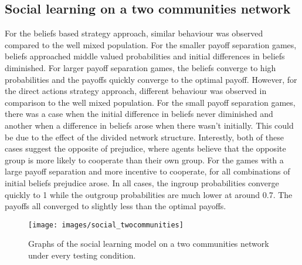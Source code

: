 \documentclass[]{llncs}
\begin{document}
\subsection{Social learning on a two communities network}
For the beliefs based strategy approach, similar behaviour was observed compared to the well mixed population. For the smaller payoff separation games, beliefs approached middle valued probabilities and initial differences in beliefs diminished. For larger payoff separation games, the beliefs converge to high probabilities and the payoffs quickly converge to the optimal payoff.
However, for the direct actions strategy approach, different behaviour was observed in comparison to the well mixed population. For the small payoff separation games, there was a case when the initial difference in beliefs never diminished and another when a difference in beliefs arose when there wasn’t initially. This could be due to the effect of the divided network structure. Interestly, both of these cases suggest the opposite of prejudice, where agents believe that the opposite group is more likely to cooperate than their own group.
For the games with a large payoff separation and more incentive to cooperate, for all combinations of initial beliefs prejudice arose. In all cases, the ingroup probabilities converge quickly to 1 while the outgroup probabilities are much lower at around 0.7. The payoffs all converged to slightly less than the optimal payoffs.

\begin{figure}
\centering
\texttt{[image: images/social\_twocommunities]}
\caption{\label{social_twocommunities} Graphs of the social learning model on a two communities network under every testing condition.}
\end{figure}
\end{document}

